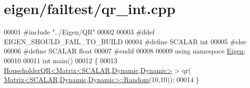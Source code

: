 \hypertarget{eigen_2failtest_2qr__int_8cpp_source}{}\section{eigen/failtest/qr\+\_\+int.cpp}
\label{eigen_2failtest_2qr__int_8cpp_source}

\begin{DoxyCode}
00001 \textcolor{preprocessor}{#include "../Eigen/QR"}
00002 
00003 \textcolor{preprocessor}{#ifdef EIGEN\_SHOULD\_FAIL\_TO\_BUILD}
00004 \textcolor{preprocessor}{#define SCALAR int}
00005 \textcolor{preprocessor}{#else}
00006 \textcolor{preprocessor}{#define SCALAR float}
00007 \textcolor{preprocessor}{#endif}
00008 
00009 \textcolor{keyword}{using namespace }\hyperlink{namespace_eigen}{Eigen};
00010 
00011 \textcolor{keywordtype}{int} main()
00012 \{
00013   \hyperlink{group___q_r___module_class_eigen_1_1_householder_q_r}{HouseholderQR<Matrix<SCALAR,Dynamic,Dynamic>} > qr(
      \hyperlink{group___core___module_class_eigen_1_1_matrix}{Matrix<SCALAR,Dynamic,Dynamic>::Random}(10,10));
00014 \}
\end{DoxyCode}
